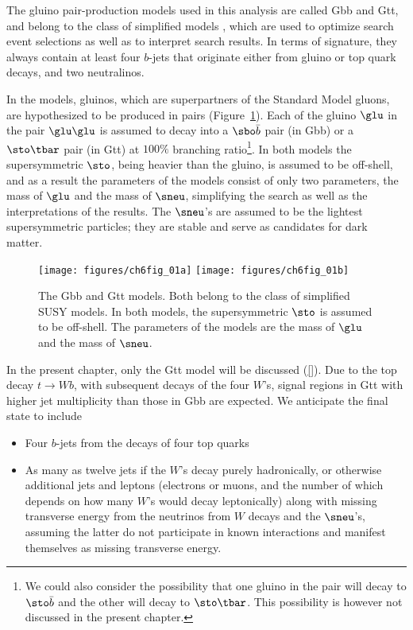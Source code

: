 The gluino pair-production models used in this analysis are called Gbb and Gtt,
and belong to the class of simplified models \cite{Alwall:2008ag,Alves:2011wf},
which are used to optimize search event selections as well as to interpret
search results. In terms of signature, they always contain at least four
$b$-jets that originate either from gluino or top quark decays, and two
neutralinos.

In the models, gluinos, which are superpartners of the Standard Model gluons,
are hypothesized to be produced in pairs (Figure~\ref{f:gttfey}). Each of the
gluino $\glu$ in the pair $\glu\glu$ is assumed to decay into a $\sbo\bar{b}$
pair (in Gbb) or a $\sto\tbar$ pair (in Gtt) at $100\%$ branching
ratio\footnote{We could also consider the possibility that one gluino in the
	pair will decay to $\sto\bar{b}$ and the other will decay to $\sto\tbar$. This
	possibility is however not discussed in the present chapter.}. In both models
the supersymmetric $\sto$, being heavier than the gluino, is assumed to be
off-shell, and as a result the parameters of the models consist of only two
parameters, the mass of $\glu$ and the mass of $\sneu$, simplifying the search
as well as the interpretations of the results. The $\sneu$'s are assumed to be
the lightest supersymmetric particles; they are stable and serve as candidates
for dark matter.

\begin{figure}[H]
	\texttt{[image: figures/ch6fig\_01a]}
	\texttt{[image: figures/ch6fig\_01b]}
	\centering

	\caption{The Gbb and Gtt models. Both belong to the class of simplified SUSY
		models. In both models, the supersymmetric $\sto$ is assumed to be off-shell.
		The parameters of the models are the mass of $\glu$ and the mass of $\sneu$.}

	\label{f:gttfey}
\end{figure}

In the present chapter, only the Gtt model will be discussed (\ref{}). Due to
the top decay $t\to Wb$, with subsequent decays of the four $W$'s, signal
regions in Gtt with higher jet multiplicity than those in Gbb are expected. We
anticipate the final state to include

\begin{itemize}

	\item Four $b$-jets from the decays of four top quarks

	\item As many as twelve jets if the $W$'s decay purely hadronically, or
	      otherwise additional jets and leptons (electrons or muons, and the number of
	      which depends on how many $W$'s would decay leptonically) along with missing
	      transverse energy from the neutrinos from $W$ decays and the $\sneu$'s,
	      assuming the latter do not participate in known interactions and manifest
	      themselves as missing transverse energy.

\end{itemize}

